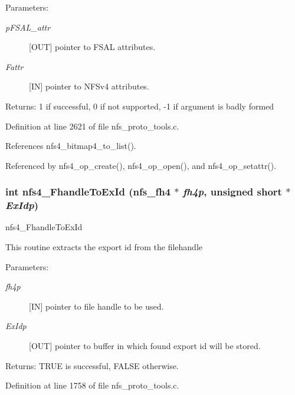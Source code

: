 \begin{Desc}
\item[Parameters:]
\begin{description}
\item[{\em p\-FSAL\_\-attr}][OUT] pointer to FSAL attributes. \item[{\em Fattr}][IN] pointer to NFSv4 attributes.\end{description}
\end{Desc}
\begin{Desc}
\item[Returns:]1 if successful, 0 if not supported, -1 if argument is badly formed \end{Desc}


Definition at line 2621 of file nfs\_\-proto\_\-tools.c.

References nfs4\_\-bitmap4\_\-to\_\-list().

Referenced by nfs4\_\-op\_\-create(), nfs4\_\-op\_\-open(), and nfs4\_\-op\_\-setattr().
\subsubsection{\setlength{\rightskip}{0pt plus 5cm}int nfs4\_\-Fhandle\-To\-Ex\-Id (nfs\_\-fh4 $\ast$ {\em fh4p}, unsigned short $\ast$ {\em Ex\-Idp})}\label{nfs__proto__tools_8c_a11}


nfs4\_\-Fhandle\-To\-Ex\-Id

This routine extracts the export id from the filehandle

\begin{Desc}
\item[Parameters:]
\begin{description}
\item[{\em fh4p}][IN] pointer to file handle to be used. \item[{\em Ex\-Idp}][OUT] pointer to buffer in which found export id will be stored.\end{description}
\end{Desc}
\begin{Desc}
\item[Returns:]TRUE is successful, FALSE otherwise. \end{Desc}


Definition at line 1758 of file nfs\_\-proto\_\-tools.c.
